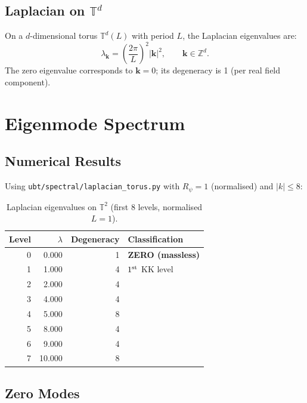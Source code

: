 \documentclass[12pt,a4paper]{article}
\newcommand{\T}{\mathbb{T}}
\newcommand{\Z}{\mathbb{Z}}
\begin{document}
\subsection{Laplacian on $\T^d$}

On a $d$-dimensional torus $\T^d(L)$ with period $L$, the Laplacian
eigenvalues are:
\begin{equation}
  \lambda_{\mathbf{k}} = \left(\frac{2\pi}{L}\right)^2 |\mathbf{k}|^2,
  \qquad \mathbf{k}\in\Z^d.
  \label{eq:torus_eigenvalues}
\end{equation}
The zero eigenvalue corresponds to $\mathbf{k}=0$; its degeneracy is 1
(per real field component).

\section{Eigenmode Spectrum}
\label{sec:spectrum}

\subsection{Numerical Results}

Using \texttt{ubt/spectral/laplacian\_torus.py} with $R_\psi = 1$
(normalised) and $|k|\le 8$:

\begin{table}[ht]
\centering
\caption{Laplacian eigenvalues on $\T^2$ (first 8 levels, normalised $L=1$).}
\begin{tabular}{rrrl}
\toprule
Level & $\lambda$ & Degeneracy & Classification \\
\midrule
0 & 0.000 & 1 & \textbf{ZERO (massless)} \\
1 & 1.000 & 4 & $1^{\rm st}$ KK level \\
2 & 2.000 & 4 & \\
3 & 4.000 & 4 & \\
4 & 5.000 & 8 & \\
5 & 8.000 & 4 & \\
6 & 9.000 & 4 & \\
7 & 10.000 & 8 & \\
\bottomrule
\end{tabular}
\end{table}

\subsection{Zero Modes}
\end{document}
